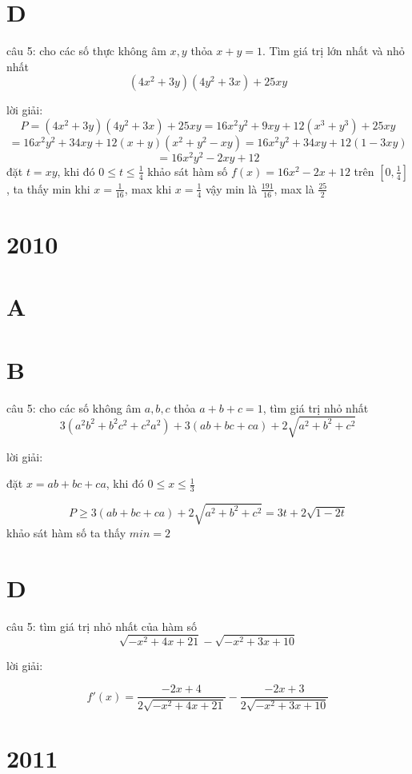 \documentclass{article}
\begin{document}
\section*{D}

câu 5: cho các số thực không âm $x,y$ thỏa $x+y=1$. Tìm giá trị lớn nhất và nhỏ nhất
\[(4x^2+3y)(4y^2+3x)+25xy\]

lời giải:
\[P=(4x^2+3y)(4y^2+3x)+25xy = 16x^2y^2+9xy+12(x^3+y^3) + 25xy\]
\[=16x^2y^2+34xy + 12(x+y)(x^2+y^2-xy)=16x^2y^2+34xy + 12(1-3xy)\]
\[=16x^2y^2-2xy+12\]
đặt $t=xy$, khi đó $0\leq t \leq \frac{1}{4}$
\newline
khảo sát hàm số $f(x)=16x^2-2x+12$ trên $[0,\frac{1}{4}]$, ta thấy min khi $x=\frac{1}{16}$, max khi $x=\frac{1}{4}$
\newline
vậy min là $\frac{191}{16}$, max là $\frac{25}{2}$

\section*{2010}
\section*{A}


\section*{B}
câu 5: cho các số không âm $a,b,c$ thỏa $a+b+c=1$, tìm giá trị nhỏ nhất
\[3(a^2b^2 + b^2c^2 + c^2a^2) + 3(ab+bc+ca) + 2\sqrt{a^2+b^2+c^2}\]

lời giải:

đặt $x=ab+bc+ca$, khi đó $0\leq x \leq \frac{1}{3}$

\[P \geq 3(ab+bc+ca) + 2\sqrt{a^2+b^2+c^2} = 3t+2\sqrt{1-2t}\]
khảo sát hàm số ta thấy $min=2$
\section*{D}

câu 5: tìm giá trị nhỏ nhất của hàm số
\[\sqrt{-x^2+4x+21}-\sqrt{-x^2+3x+10}\]

lời giải:









\[f'(x)= \frac{-2x+4}{2\sqrt{-x^2+4x+21}} - \frac{-2x+3}{2\sqrt{-x^2+3x+10}} \]



\section*{2011}
\end{document}
